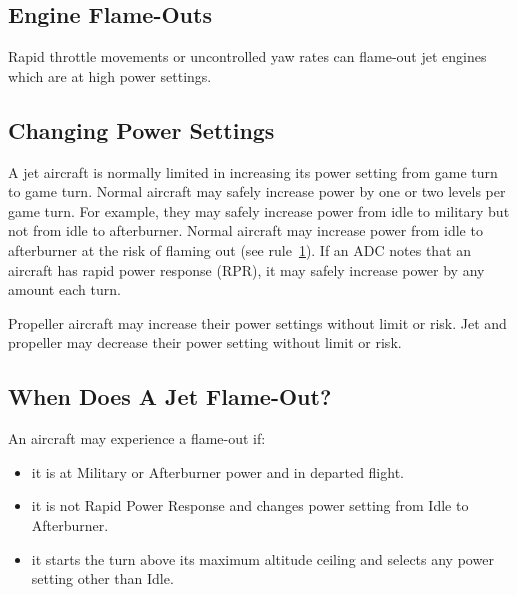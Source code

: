\begin{advancedrules}
    \section{Engine Flame-Outs}
    \label{rule:engine-flame-outs}

    Rapid throttle movements or uncontrolled yaw rates can flame-out jet engines which are at high power settings.

    \subsection{Changing Power Settings}\label{rule:rapid-power-response} A jet aircraft is normally limited in increasing its power setting from game turn to game turn. Normal aircraft may safely increase power by one or two levels per game turn. For example, they may safely increase power from idle to military but not from idle to afterburner. Normal aircraft may increase power from idle to afterburner at the risk of flaming out (see rule~\ref{rule:engine-flame-outs}). If an ADC notes that an aircraft has rapid power response (RPR), it may safely increase power by any amount each turn.

    Propeller aircraft may increase their power settings without limit or risk. Jet and propeller may decrease their power setting without limit or risk.

    \subsection{When Does A Jet Flame-Out?} An aircraft may experience a flame-out if:

    \begin{itemize}

        \item it is at Military or Afterburner power and in departed flight.

        \item it is not Rapid Power Response and changes power setting from Idle to Afterburner.

        \item it starts the turn above its maximum altitude ceiling and selects any power setting other than Idle.

    \end{itemize}



\end{advancedrules}
